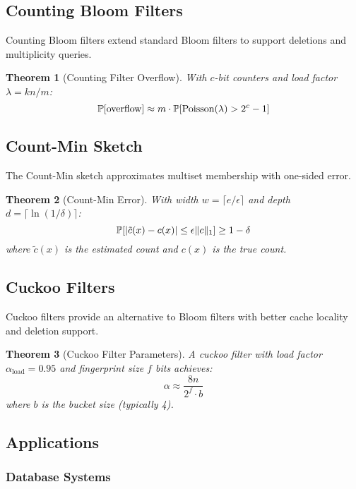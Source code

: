 \documentclass[11pt]{article}
\newtheorem{theorem}{Theorem}[section]
\begin{document}
\subsection{Counting Bloom Filters}

Counting Bloom filters extend standard Bloom filters to support deletions and multiplicity queries.

\begin{theorem}[Counting Filter Overflow]
With $c$-bit counters and load factor $\lambda = kn/m$:
\[
\mathbb{P}[\text{overflow}] \approx m \cdot \mathbb{P}[\text{Poisson}(\lambda) > 2^c - 1]
\]
\end{theorem}

\subsection{Count-Min Sketch}

The Count-Min sketch approximates multiset membership with one-sided error.

\begin{theorem}[Count-Min Error]
With width $w = \lceil e/\epsilon \rceil$ and depth $d = \lceil \ln(1/\delta) \rceil$:
\[
\mathbb{P}[|\tilde{c}(x) - c(x)| \leq \epsilon \|c\|_1] \geq 1 - \delta
\]
where $\tilde{c}(x)$ is the estimated count and $c(x)$ is the true count.
\end{theorem}

\subsection{Cuckoo Filters}

Cuckoo filters provide an alternative to Bloom filters with better cache locality and deletion support.

\begin{theorem}[Cuckoo Filter Parameters]
A cuckoo filter with load factor $\alpha_{\text{load}} = 0.95$ and fingerprint size $f$ bits achieves:
\[
\alpha \approx \frac{8n}{2^f \cdot b}
\]
where $b$ is the bucket size (typically 4).
\end{theorem}

\subsection{Applications}

\subsubsection{Database Systems}
\end{document}
